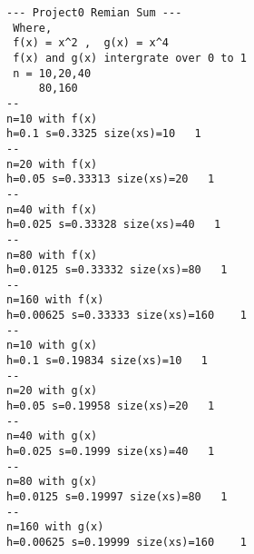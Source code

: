 \begin{lstlisting}
--- Project0 Remian Sum ---
 Where, 
 f(x) = x^2 ,  g(x) = x^4
 f(x) and g(x) intergrate over 0 to 1
 n = 10,20,40
     80,160
--
n=10 with f(x)
h=0.1 s=0.3325 size(xs)=10   1
--
n=20 with f(x)
h=0.05 s=0.33313 size(xs)=20   1
--
n=40 with f(x)
h=0.025 s=0.33328 size(xs)=40   1
--
n=80 with f(x)
h=0.0125 s=0.33332 size(xs)=80   1
--
n=160 with f(x)
h=0.00625 s=0.33333 size(xs)=160    1
--
n=10 with g(x)
h=0.1 s=0.19834 size(xs)=10   1
--
n=20 with g(x)
h=0.05 s=0.19958 size(xs)=20   1
--
n=40 with g(x)
h=0.025 s=0.1999 size(xs)=40   1
--
n=80 with g(x)
h=0.0125 s=0.19997 size(xs)=80   1
--
n=160 with g(x)
h=0.00625 s=0.19999 size(xs)=160    1
\end{lstlisting}